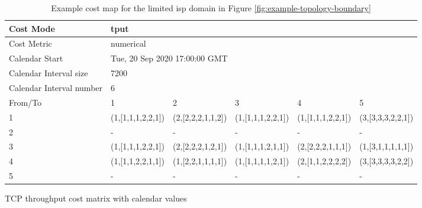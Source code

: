 \begin{table}[H]
\begin{subtable}{.30\linewidth}
    \label{table:cost-throughput-ordinal}
    \end{subtable}
    \begin{subtable}{1\linewidth}
        \footnotesize
        \centering
        \hspace*{-2em}
        \begin{tabular}{|l|l|l|l|l|l|}
        \hline
        Cost Mode                & \multicolumn{5}{|l|}{tput}                            \\ \hline
        Cost Metric              & \multicolumn{5}{|l|}{numerical}                       \\ \hline
        Calendar Start           & \multicolumn{5}{|l|}{Tue, 20 Sep 2020 17:00:00 GMT}   \\ \hline
        Calendar Interval size   & \multicolumn{5}{|l|}{7200}                            \\ \hline
        Calendar Interval number & \multicolumn{5}{|l|}{6}                               \\ \hline
        From/To                  & 1                    & 2                     & 3                        & 4                   & 5                  \\ \hline
        1                        & (1,[1,1,1,2,2,1])    & (2,[2,2,2,1,1,2])     & (1,[1,1,1,2,2,1])        & (1,[1,1,1,2,2,1])   & (3,[3,3,3,2,2,1])  \\ \hline
        2                        & -                    & -                     & -                        & -                   & -                  \\ \hline
        3                        & (1,[1,1,1,2,2,1])    & (2,[2,2,2,1,2,1])     & (1,[1,1,1,2,1,1])        & (2,[2,2,2,1,1,1])   & (1,[3,1,1,1,1,1])  \\ \hline
        4                        & (1,[1,1,2,2,1,1])    & (1,[2,2,1,1,1,1])     & (1,[1,1,1,1,2,1])        & (2,[1,1,2,2,2,2])   & (3,[3,3,3,3,2,2])  \\ \hline
        5                        & -                    & -                     & -                        & -                   & -                  \\ \hline
        \end{tabular}
    \caption{TCP throughput cost matrix with calendar values}
    \label{table:cost-calendar}
    \end{subtable}

    \caption{Example cost map for the limited \gls{isp} domain in Figure \ref{fig:example-topology-boundary}}
    \label{table:costmap-example-boundary}
\end{table}


